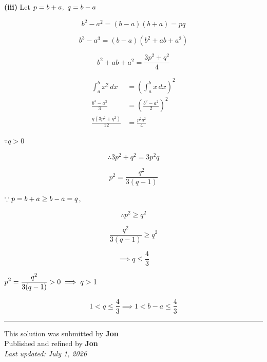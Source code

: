 \documentclass[12pt]{article}
\begin{document}
\textbf{(iii)} Let $\ds p=b+a,\ q=b-a$

$$b^2-a^2=(b-a)(b+a)=pq$$

$$b^3-a^3=(b-a)(b^2+ab+a^2)$$

$$b^2+ab+a^2=\frac{3p^2+q^2}{4}$$

\begin{align*}
\int_a^b x^2\,dx&=\left(\int_a^b x\,dx\right)^2\\
\frac{b^3-a^3}{3}&=\left(\frac{b^2-a^2}{2}\right)^2\\
\frac{q(3p^2+q^2)}{12}&=\frac{p^2q^2}{4}
\end{align*}

$\because q>0$

$$\therefore 3p^2+q^2=3p^2q$$

$$p^2=\frac{q^2}{3(q-1)}$$

$\because \displaystyle p=b+a\geq b-a=q$,

$$\therefore p^2\geq q^2$$

$$\frac{q^2}{3(q-1)}\geq q^2$$

$$\implies q\leq \frac43$$

$\displaystyle p^2=\frac{q^2}{3(q-1)}>0\implies q>1$

$$1<q\leq \frac43\implies 1<b-a\leq \frac43$$

\bigskip
\hrule
\begin{center}
    This solution was submitted by \textbf{Jon}\\[4pt]
    Published and refined by \textbf{Jon}\\[8pt]
    \textit{Last updated: July 1, 2026}
\end{center}
\end{document}

